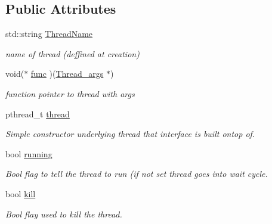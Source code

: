 \subsection*{Public Attributes}
\begin{DoxyCompactItemize}
\item 
\hypertarget{structThread__args_a594f831be7ce66015a7606e023b24cf4}{std\-::string \hyperlink{structThread__args_a594f831be7ce66015a7606e023b24cf4}{Thread\-Name}}\label{structThread__args_a594f831be7ce66015a7606e023b24cf4}

\begin{DoxyCompactList}\small\item\em name of thread (deffined at creation) \end{DoxyCompactList}\item 
\hypertarget{structThread__args_a674c5df8bb54ea3f96befbef2dfb1a78}{void($\ast$ \hyperlink{structThread__args_a674c5df8bb54ea3f96befbef2dfb1a78}{func} )(\hyperlink{structThread__args}{Thread\-\_\-args} $\ast$)}\label{structThread__args_a674c5df8bb54ea3f96befbef2dfb1a78}

\begin{DoxyCompactList}\small\item\em function pointer to thread with args \end{DoxyCompactList}\item 
\hypertarget{structThread__args_a4f71beb11e75d05269fc63ca7c19a8a9}{pthread\-\_\-t \hyperlink{structThread__args_a4f71beb11e75d05269fc63ca7c19a8a9}{thread}}\label{structThread__args_a4f71beb11e75d05269fc63ca7c19a8a9}

\begin{DoxyCompactList}\small\item\em Simple constructor underlying thread that interface is built ontop of. \end{DoxyCompactList}\item 
\hypertarget{structThread__args_a9cb8f6b709c5687bf28531bf4d808c75}{bool \hyperlink{structThread__args_a9cb8f6b709c5687bf28531bf4d808c75}{running}}\label{structThread__args_a9cb8f6b709c5687bf28531bf4d808c75}

\begin{DoxyCompactList}\small\item\em Bool flag to tell the thread to run (if not set thread goes into wait cycle. \end{DoxyCompactList}\item 
\hypertarget{structThread__args_a298b8c85c8598ecc557e2090d90a73c3}{bool \hyperlink{structThread__args_a298b8c85c8598ecc557e2090d90a73c3}{kill}}\label{structThread__args_a298b8c85c8598ecc557e2090d90a73c3}

\begin{DoxyCompactList}\small\item\em Bool flay used to kill the thread. \end{DoxyCompactList}\end{DoxyCompactItemize}


